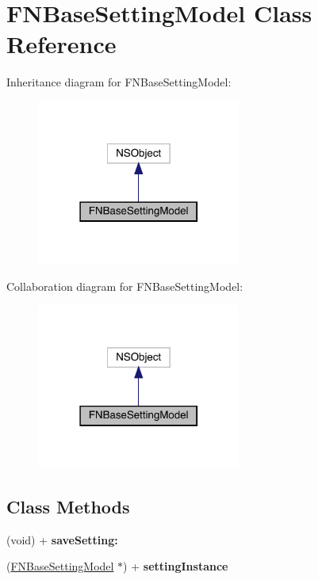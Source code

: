 \hypertarget{interface_f_n_base_setting_model}{}\section{F\+N\+Base\+Setting\+Model Class Reference}
\label{interface_f_n_base_setting_model}


Inheritance diagram for F\+N\+Base\+Setting\+Model\+:\nopagebreak
\begin{figure}[H]
\begin{center}
\leavevmode
\includegraphics[width=190pt]{interface_f_n_base_setting_model__inherit__graph}
\end{center}
\end{figure}


Collaboration diagram for F\+N\+Base\+Setting\+Model\+:\nopagebreak
\begin{figure}[H]
\begin{center}
\leavevmode
\includegraphics[width=190pt]{interface_f_n_base_setting_model__coll__graph}
\end{center}
\end{figure}
\subsection*{Class Methods}
\begin{DoxyCompactItemize}
\item 
\mbox{\label{interface_f_n_base_setting_model_a7a88ffe8ab241ebf31b1e2741357334c}} 
(void) + {\bfseries save\+Setting\+:}
\item 
\mbox{\label{interface_f_n_base_setting_model_a262a36072915f27f8eebb35c869b43af}} 
(\mbox{\hyperlink{interface_f_n_base_setting_model}{F\+N\+Base\+Setting\+Model}} $\ast$) + {\bfseries setting\+Instance}
\end{DoxyCompactItemize}
